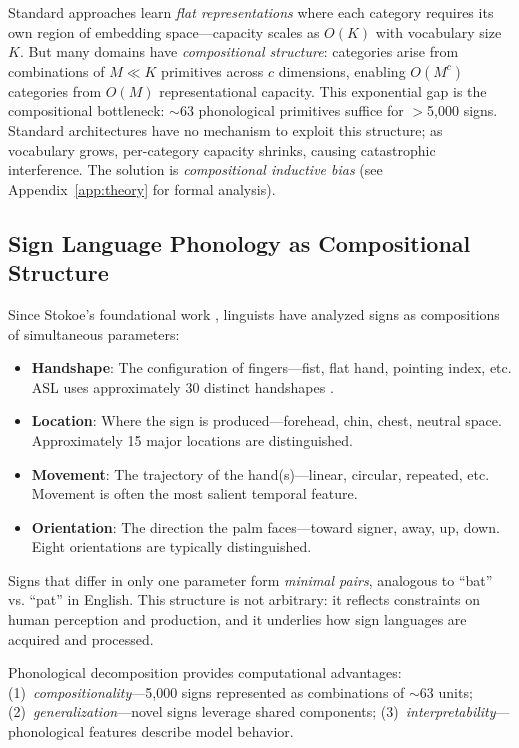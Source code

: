 \documentclass[sigconf,nonacm,anonymous]{acmart}
\theoremstyle{definition}
\theoremstyle{remark}
\begin{document}
Standard approaches learn \textit{flat representations} where each category requires its own region of embedding space---capacity scales as $O(K)$ with vocabulary size $K$. But many domains have \textit{compositional structure}: categories arise from combinations of $M \ll K$ primitives across $c$ dimensions, enabling $O(M^c)$ categories from $O(M)$ representational capacity. This exponential gap is the compositional bottleneck: $\sim$63 phonological primitives suffice for $>$5,000 signs. Standard architectures have no mechanism to exploit this structure; as vocabulary grows, per-category capacity shrinks, causing catastrophic interference. The solution is \textit{compositional inductive bias} (see Appendix~\ref{app:theory} for formal analysis).

\subsection{Sign Language Phonology as Compositional Structure}

Since Stokoe's foundational work \cite{stokoe1960sign}, linguists have analyzed signs as compositions of simultaneous parameters:
\begin{itemize}[nosep,topsep=2pt]
\item \textbf{Handshape}: The configuration of fingers---fist, flat hand, pointing index, etc. ASL uses approximately 30 distinct handshapes \cite{battison1978lexical}.
\item \textbf{Location}: Where the sign is produced---forehead, chin, chest, neutral space. Approximately 15 major locations are distinguished.
\item \textbf{Movement}: The trajectory of the hand(s)---linear, circular, repeated, etc. Movement is often the most salient temporal feature.
\item \textbf{Orientation}: The direction the palm faces---toward signer, away, up, down. Eight orientations are typically distinguished.
\end{itemize}

Signs that differ in only one parameter form \textit{minimal pairs}, analogous to ``bat'' vs. ``pat'' in English. This structure is not arbitrary: it reflects constraints on human perception and production, and it underlies how sign languages are acquired and processed.

Phonological decomposition provides computational advantages: (1)~\textit{compositionality}---5,000 signs represented as combinations of $\sim$63 units; (2)~\textit{generalization}---novel signs leverage shared components; (3)~\textit{interpretability}---phonological features describe model behavior.
\end{document}
